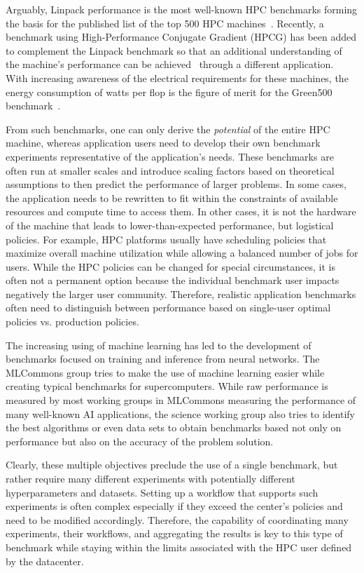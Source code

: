 \documentclass[sigconf]{acmart}
\begin{document}
Arguably, Linpack performance is the most well-known HPC benchmarks forming the basis for the published list of the top 500 HPC machines~\citep{www-top500}. Recently, a benchmark using High-Performance Conjugate Gradient (HPCG) has been added to complement the Linpack benchmark so that an additional understanding of the machine's performance can be achieved~\citep{www-top500} through a different application. With increasing awareness of the electrical requirements for these machines, the energy consumption of watts per flop is the figure of merit for the Green500 benchmark~\citep{green500}.

From such benchmarks, one can only derive the {\em potential} of the entire HPC machine, whereas application users need to develop their own benchmark experiments representative of the application's needs. These benchmarks are often run at smaller scales and introduce scaling factors based on theoretical assumptions to then predict the performance of larger problems. In some cases, the application needs to be rewritten to fit within the constraints of available resources and compute time to access them. In other cases, it is not the hardware of the machine that leads to lower-than-expected performance, but logistical policies. For example, HPC platforms usually have scheduling policies that maximize overall machine utilization while allowing a balanced number of jobs for users. While the HPC policies can be changed for special circumstances, it is often not a permanent option because the individual benchmark user impacts negatively the larger user community. Therefore, realistic application benchmarks often need to distinguish between performance based on single-user optimal policies vs. production policies. 

The increasing using of machine learning has led to the development of benchmarks focused on training and inference from neural networks. The MLCommons group tries to make the use of machine learning easier while creating typical benchmarks for supercomputers. While raw performance is measured by most working groups in MLCommons measuring the performance of many well-known AI applications, the science working group also tries to identify the best algorithms or even data sets to obtain benchmarks based not only on performance but also on the accuracy of the problem solution.

Clearly, these multiple objectives preclude the use of a single benchmark, but rather require many different experiments with potentially different hyperparameters and datasets. Setting up a workflow that supports such experiments is often complex especially if they exceed the center's policies and need to be modified accordingly. Therefore, the capability of coordinating many experiments, their workflows, and aggregating the results is key to this type of benchmark while staying within the limits associated with the HPC user defined by the datacenter.
\end{document}
